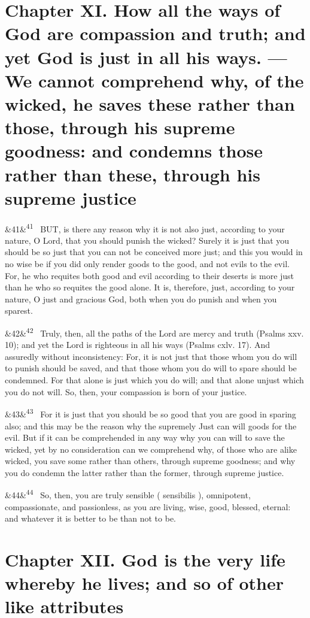 \documentclass[12pt]{article}
\newcommand{\para}[1][]{\par\noindent\ifx&#1&\else\textsuperscript{\footnotesize #1}~\fi}
\begin{document}
\section*{Chapter XI. How all the ways of God are compassion and truth; and yet God is just in all his ways. ---We cannot comprehend why, of the wicked, he saves these rather than those, through his supreme goodness: and condemns those rather than these, through his supreme justice}

\para[41] BUT, is there any reason why it is not also just, according to your nature, O Lord, that you should punish the wicked? Surely it is just that you should be so just that you can not be conceived more just; and this you would in no wise be if you did only render goods to the good, and not evils to the evil. For, he who requites both good and evil according to their deserts is more just than he who so requites the good alone. It is, therefore, just, according to your nature, O just and gracious God, both when you do punish and when you sparest.

\para[42] Truly, then, all the paths of the Lord are mercy and truth (Psalms xxv. 10); and yet the Lord is righteous in all his ways (Psalms cxlv. 17). And assuredly without inconsistency: For, it is not just that those whom you do will to punish should be saved, and that those whom you do will to spare should be condemned. For that alone is just which you do will; and that alone unjust which you do not will. So, then, your compassion is born of your justice.

\para[43] For it is just that you should be so good that you are good in sparing also; and this may be the reason why the supremely Just can will goods for the evil. But if it can be comprehended in any way why you can will to save the wicked, yet by no consideration can we comprehend why, of those who are alike wicked, you save some rather than others, through supreme goodness; and why you do condemn the latter rather than the former, through supreme justice.

\para[44] So, then, you are truly sensible ( sensibilis ), omnipotent, compassionate, and passionless, as you are living, wise, good, blessed, eternal: and whatever it is better to be than not to be.


\section*{Chapter XII. God is the very life whereby he lives; and so of other like attributes}
\end{document}
